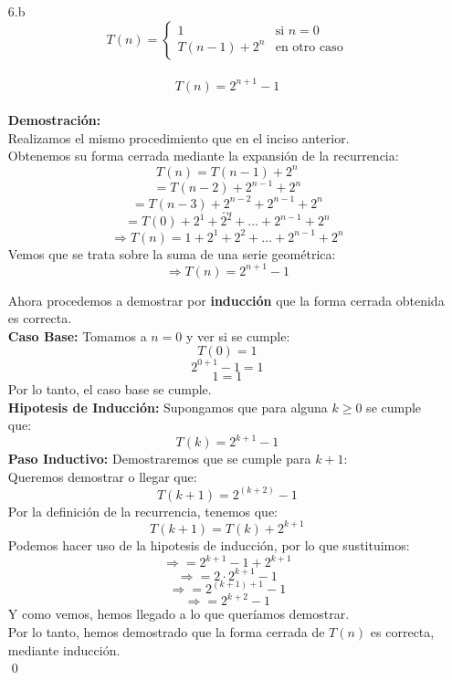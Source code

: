 \documentclass[12pt]{article}
\begin{document}
\begin{itemize}
    \item[6.b]
    \[
        T(n) = \left\{ \begin{array}{ll}
        1 & \text{si } n=0\\ T(n-1)+2^n & \text{en otro caso} \end{array}\right.
    \]
    \\
    \[
        T(n) = 2^{n+1}-1
    \]
    \\\textbf{Demostración:}\\
    Realizamos el mismo procedimiento que en el inciso anterior.\\
    Obtenemos su forma cerrada mediante la expansión de la recurrencia:
    \[
        T(n) = T(n-1) + 2^n
    \]
    \[
        = T(n-2) + 2^{n-1} + 2^n
    \]
    \[
        = T(n-3) + 2^{n-2} + 2^{n-1} + 2^n
    \]
    \[
        ...
    \]
    \[
        = T(0) + 2^1 + 2^2 + ... + 2^{n-1} + 2^n
    \]
    \[
    \Rightarrow T(n) = 1 + 2^1 + 2^2 + ... + 2^{n-1} + 2^n
    \]
    Vemos que se trata sobre la suma de una serie geométrica:
    \[
    \Rightarrow T(n) = 2^{n+1} - 1
    \]

    Ahora procedemos a demostrar por \textbf{inducción} que la forma cerrada obtenida es correcta.\\
    \textbf{Caso Base:} Tomamos a $n = 0$ y ver si se cumple:
    \[
        T(0) = 1
    \]
    \[
        2^{0+1} - 1 = 1
    \]
    \[
        1 = 1
    \]
    Por lo tanto, el caso base se cumple.\\
    \textbf{Hipotesis de Inducción:} Supongamos que para alguna $k \geq 0$ se cumple que:
    \[
        T(k) = 2^{k+1} - 1
    \]
    \textbf{Paso Inductivo:} Demostraremos que se cumple para $k + 1$:\\
    Queremos demostrar o llegar que:
    \[
        T(k+1) = 2^{(k+2)} - 1
    \]
    Por la definición de la recurrencia, tenemos que:
    \[
        T(k+1) = T(k) + 2^{k + 1}
    \]
    Podemos hacer uso de la hipotesis de inducción, por lo que sustituimos:
    \[
    \Rightarrow = 2^{k+1} - 1 +
        2^{k + 1}
    \]
    \[        \Rightarrow = 2 \cdot 2^{k+1} - 1
    \]
    \[        \Rightarrow = 2^{(k+1)+1} - 1
    \]
    \[        \Rightarrow = 2^{k+2} - 1
    \]
    Y como vemos, hemos llegado a lo que queríamos demostrar.\\
    Por lo tanto, hemos demostrado que la forma cerrada de $T(n)$ es correcta, mediante inducción.\\
    \qed



\end{itemize}
\end{document}
